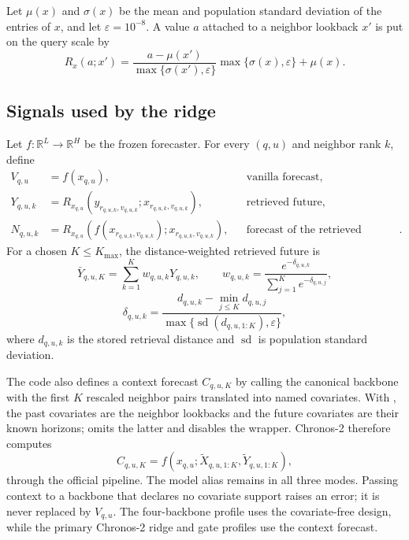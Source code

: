 \documentclass[11pt]{article}
\newcommand{\Kmax}{K_{\max}}
\newcommand{\eps}{\varepsilon}
\newcommand{\code}[1]{\texttt{\detokenize{#1}}}
\begin{document}
Let $\mu(x)$ and $\sigma(x)$ be the mean and population standard deviation of
the entries of $x$, and let $\eps=10^{-8}$. A value $a$ attached to a neighbor
lookback $x'$ is put on the query scale by
\[
 R_x(a;x')=
 \frac{a-\mu(x')}{\max\{\sigma(x'),\eps\}}
 \max\{\sigma(x),\eps\}+\mu(x).                             \tag{8}
\]

\subsection{Signals used by the ridge}

Let $f:\mathbb R^L\to\mathbb R^H$ be the frozen forecaster. For every
$(q,u)$ and neighbor rank $k$, define
\begin{align*}
 V_{q,u} &= f(x_{q,u}), &&\text{vanilla forecast},\\
 Y_{q,u,k} &= R_{x_{q,u}}(y_{r_{q,u,k},v_{q,u,k}};
                         x_{r_{q,u,k},v_{q,u,k}}),
 &&\text{retrieved future},\\
 N_{q,u,k} &= R_{x_{q,u}}(f(x_{r_{q,u,k},v_{q,u,k}});
                         x_{r_{q,u,k},v_{q,u,k}}),
 &&\text{forecast of the retrieved lookback}.
\end{align*}
For a chosen $K\le\Kmax$, the distance-weighted retrieved future is
\[
 \bar Y_{q,u,K}=\sum_{k=1}^K w_{q,u,k}Y_{q,u,k},\qquad
 w_{q,u,k}=\frac{e^{-\delta_{q,u,k}}}
                  {\sum_{j=1}^K e^{-\delta_{q,u,j}}},
\]
\[
 \delta_{q,u,k}=\frac{d_{q,u,k}-\min_{j\le K}d_{q,u,j}}
 {\max\{\operatorname{sd}(d_{q,u,1:K}),\eps\}},             \tag{9}
\]
where $d_{q,u,k}$ is the stored retrieval distance and $\operatorname{sd}$ is
population standard deviation.

The code also defines a context forecast $C_{q,u,K}$ by calling the canonical
backbone with the first $K$ rescaled neighbor pairs translated into named
covariates. With , the past
covariates are the neighbor lookbacks and the future covariates are their known
horizons; \code{past} omits the latter and \code{none} disables the wrapper.
Chronos-2 therefore computes
\[
 C_{q,u,K}=f\!\left(x_{q,u};\widetilde X_{q,u,1:K},
                    \widetilde Y_{q,u,1:K}\right),             \tag{10}
\]
through the official pipeline. The model alias remains \code{chronos2} in all
three modes. Passing context to a backbone that declares no covariate support
raises an error; it is never replaced by $V_{q,u}$. The four-backbone profile
uses the covariate-free \code{y_ridge_shared} design, while the primary
Chronos-2 ridge and gate profiles use the context forecast.
\end{document}
